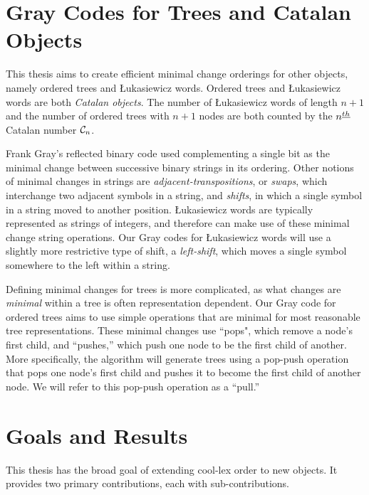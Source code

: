 \section{Gray Codes for Trees and Catalan Objects} \label{sec:intro_Graycodes}

This thesis aims to create efficient minimal change orderings for other objects, namely ordered trees and Łukasiewicz words.  Ordered trees and Łukasiewicz words are both \emph{Catalan objects}.  The number of Łukasiewicz words of length $n+1$ and the number of ordered trees with $n+1$ nodes are both counted by the $n^{\underline{th}}$ Catalan number $\mathcal{C}_n$.  

Frank Gray's reflected binary code used complementing a single bit as the minimal change between successive binary strings in its ordering.  Other notions of minimal changes in strings are \emph{adjacent-transpositions}, or \emph{swaps}, which interchange two adjacent symbols in a string, and \emph{shifts}, in which a single symbol in a string moved to another position. Łukasiewicz words are typically represented as strings of integers, and therefore can make use of these minimal change string operations.  Our Gray codes for Łukasiewicz words will use a slightly more restrictive type of shift, a \emph{left-shift}, which moves a single symbol somewhere to the left within a string. 




Defining minimal changes for trees is more complicated, as what changes are \emph{minimal} within a tree is often representation dependent.  Our Gray code for ordered trees aims to use simple operations that are minimal for most reasonable tree representations.  These minimal changes use ``pops", which remove a node's first child, and ``pushes,'' which push one node to be the first child of another.  More specifically, the algorithm will generate trees using a pop-push operation that pops one node's first child and pushes it to become the first child of another node.  We will refer to this pop-push operation as a ``pull.''




\section{Goals and Results}


This thesis has the broad goal of extending cool-lex order to new objects.  It provides two primary contributions, each with sub-contributions.  

